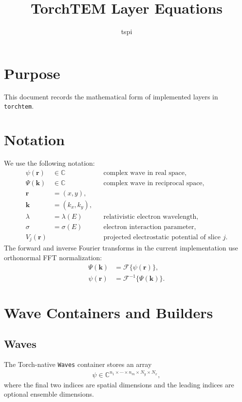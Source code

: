 \documentclass[11pt]{article}
\title{TorchTEM Layer Equations}
\author{tspi}
\date{}
\begin{document}
\maketitle

\section{Purpose}
This document records the mathematical form of implemented layers in
\texttt{torchtem}.  

\section{Notation}
We use the following notation:
\begin{align}
  \psi(\mathbf{r}) &\in \mathbb{C} && \text{complex wave in real space,} \\
  \Psi(\mathbf{k}) &\in \mathbb{C} && \text{complex wave in reciprocal space,} \\
  \mathbf{r} &= (x,y), \\
  \mathbf{k} &= (k_x,k_y), \\
  \lambda &= \lambda(E) && \text{relativistic electron wavelength,} \\
  \sigma &= \sigma(E) && \text{electron interaction parameter,} \\
  V_j(\mathbf{r}) &&& \text{projected electrostatic potential of slice } j.
\end{align}
The forward and inverse Fourier transforms in the current implementation use
orthonormal FFT normalization:
\begin{align}
  \Psi(\mathbf{k}) &= \mathcal{F}\{\psi(\mathbf{r})\}, \\
  \psi(\mathbf{r}) &= \mathcal{F}^{-1}\{\Psi(\mathbf{k})\}.
\end{align}

\section{Wave Containers and Builders}
\subsection{Waves}
The Torch-native \texttt{Waves} container stores an array
\begin{align}
  \psi \in \mathbb{C}^{n_1 \times \cdots \times n_m \times N_y \times N_x},
\end{align}
where the final two indices are spatial dimensions and the leading indices are optional
ensemble dimensions.
\end{document}
